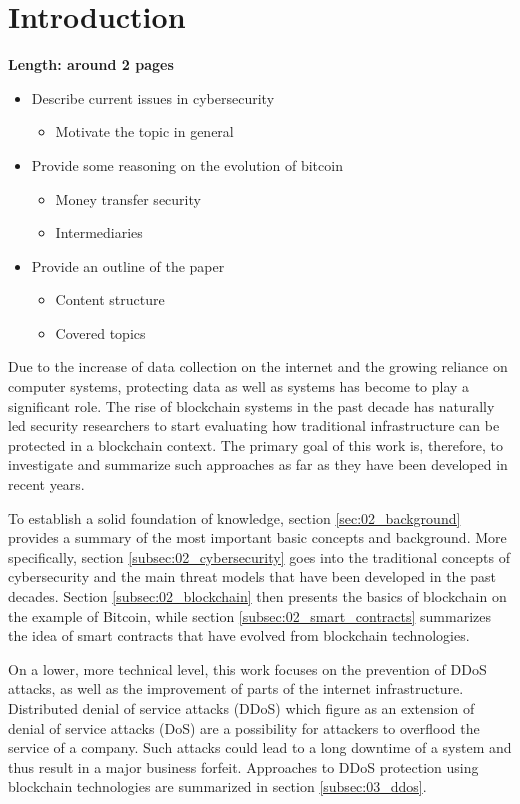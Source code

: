 \section{Introduction}

\textbf{Length: around 2 pages}

\begin{itemize}
  \item Describe current issues in cybersecurity
  \begin{itemize}
    \item Motivate the topic in general
  \end{itemize}
  \item Provide some reasoning on the evolution of bitcoin
  \begin{itemize}
    \item Money transfer security
    \item Intermediaries
  \end{itemize}
  \item Provide an outline of the paper
  \begin{itemize}
    \item Content structure
    \item Covered topics
  \end{itemize}
\end{itemize}

Due to the increase of data collection on the internet and the growing reliance on computer systems, protecting data as well as systems has become to play a significant role. The rise of blockchain systems in the past decade has naturally led security researchers to start evaluating how traditional infrastructure can be protected in a blockchain context. The primary goal of this work is, therefore, to investigate and summarize such approaches as far as they have been developed in recent years.

To establish a solid foundation of knowledge, section \ref{sec:02_background} provides a summary of the most important basic concepts and background. More specifically, section \ref{subsec:02_cybersecurity} goes into the traditional concepts of cybersecurity and the main threat models that have been developed in the past decades. Section \ref{subsec:02_blockchain} then presents the basics of blockchain on the example of Bitcoin, while section \ref{subsec:02_smart_contracts} summarizes the idea of smart contracts that have evolved from blockchain technologies.

On a lower, more technical level, this work focuses on the prevention of DDoS attacks, as well as the improvement of parts of the internet infrastructure. Distributed denial of service attacks (DDoS) which figure as an extension of denial of service attacks (DoS) are a possibility for attackers to overflood the service of a company. Such attacks could lead to a long downtime of a system and thus result in a major business forfeit. Approaches to DDoS protection using blockchain technologies are summarized in section \ref{subsec:03_ddos}.

